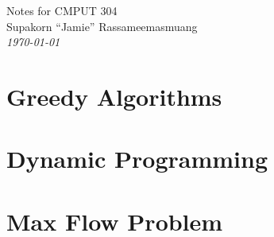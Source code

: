 \documentclass{report}
\begin{document}
\begin{titlepage}
    \centering
    \vspace*{5cm}
    {
    \Large
    Notes for CMPUT 304\\
    }
    {
    \vspace{3cm}
    Supakorn ``Jamie'' Rassameemasmuang \\
    \vspace{0.5cm}
    \textit{\today}
    }
\end{titlepage}

\tableofcontents

    \chapter{Greedy Algorithms}
    

    \chapter{Dynamic Programming}
    

    \chapter{Max Flow Problem}
    
\end{document}
